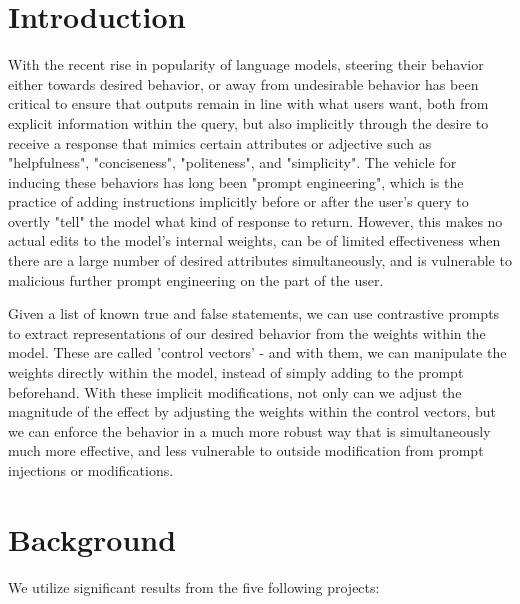 \documentclass[11pt,a4paper]{article}
\begin{document}
\section{Introduction}
With the recent rise in popularity of language models, steering their behavior either towards desired behavior, or away from undesirable behavior has been critical to ensure that outputs remain in line with what users want, both from explicit information within the query, but also implicitly through the desire to receive a response that mimics certain attributes or adjective such as "helpfulness", "conciseness", "politeness", and "simplicity". The vehicle for inducing these behaviors has long been "prompt engineering", which is the practice of adding instructions implicitly before or after the user's query to overtly "tell" the model what kind of response to return. However, this makes no actual edits to the model's internal weights, can be of limited effectiveness when there are a large number of desired attributes simultaneously, and is vulnerable to malicious further prompt engineering on the part of the user. 

Given a list of known true and false statements, we can use contrastive prompts to extract representations of our desired behavior from the weights within the model. These are called 'control vectors' - and with them, we can manipulate the weights directly within the model, instead of simply adding to the prompt beforehand. With these implicit modifications, not only can we adjust the magnitude of the effect by adjusting the weights within the control vectors, but we can enforce the behavior in a much more robust way that is simultaneously much more effective, and less vulnerable to outside modification from prompt injections or modifications.

\section{Background}
We utilize significant results from the five following projects:
\end{document}
